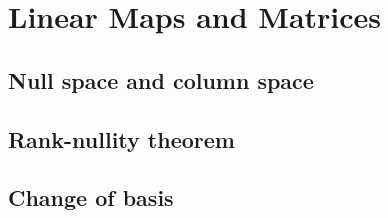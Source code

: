 
\section{Linear Maps and Matrices}

\subsection{Null space and column space}


\subsection{Rank-nullity theorem}


\subsection{Change of basis}

